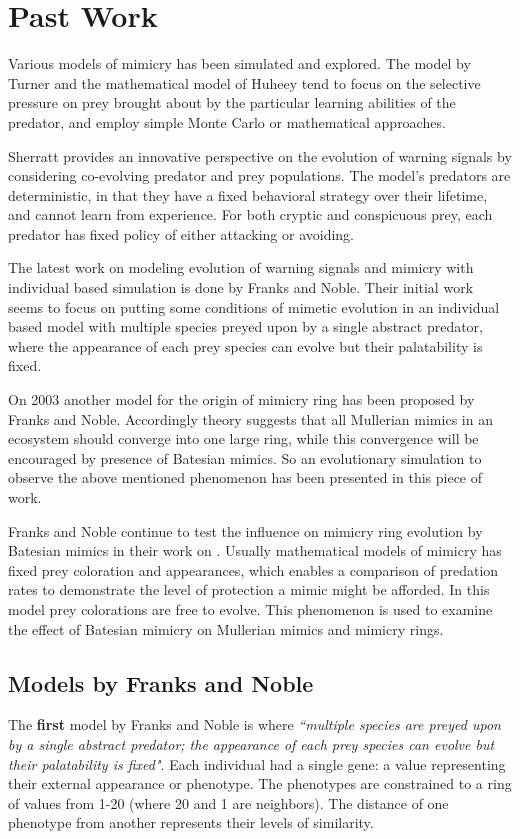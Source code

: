 \section{Past Work}
Various models of mimicry has been simulated and explored. The model by Turner \cite{turner1996} and the mathematical model of Huheey \cite{huheey1988} tend to focus on the selective pressure on prey brought about by the particular learning abilities of the predator, and employ simple Monte Carlo or mathematical approaches.

Sherratt \cite{sherratt2002} provides an innovative perspective on the evolution of warning signals by considering co-evolving predator and prey populations. The model's predators are deterministic, in that they have a fixed behavioral strategy over their lifetime, and cannot learn from experience. For both cryptic and conspicuous prey, each predator has fixed policy of either attacking or avoiding.

The latest work on modeling evolution of warning signals and mimicry with individual based simulation is done by Franks and Noble. Their initial work \cite{franks2002} seems to focus on putting some conditions of mimetic evolution in an individual based model with multiple species preyed upon by a single abstract predator, where the appearance of each prey species can evolve but their palatability is fixed.

On 2003 \cite{franks2003} another model for the origin of mimicry ring has been proposed by Franks and Noble. Accordingly theory suggests that all Mullerian mimics in an ecosystem should converge into one large ring, while this convergence will be encouraged by presence of Batesian mimics. So an evolutionary simulation to observe the above mentioned phenomenon has been presented in this piece of work.

Franks and Noble continue to test the influence on mimicry ring evolution by Batesian mimics in their work on \cite{franks2004}. Usually mathematical models of mimicry has fixed prey coloration and appearances, which enables a comparison of predation rates to demonstrate the level of protection a mimic might be afforded. In this model prey colorations are free to evolve. This phenomenon is used to examine the effect of Batesian mimicry on Mullerian mimics and mimicry rings. 

\subsection{Models by Franks and Noble}
\label{subsec:models-by-frank-and-noble}
The \textbf{first} model by Franks and Noble \cite{franks2002} is where \textsl{``multiple species are preyed upon by a single abstract predator; the appearance of each prey species can evolve but their palatability is fixed"}. Each individual had a single gene: a value representing their external appearance or phenotype. The phenotypes are constrained to a ring of values from 1-20 (where 20 and 1 are neighbors). The distance of one phenotype from another represents their levels of similarity. 


